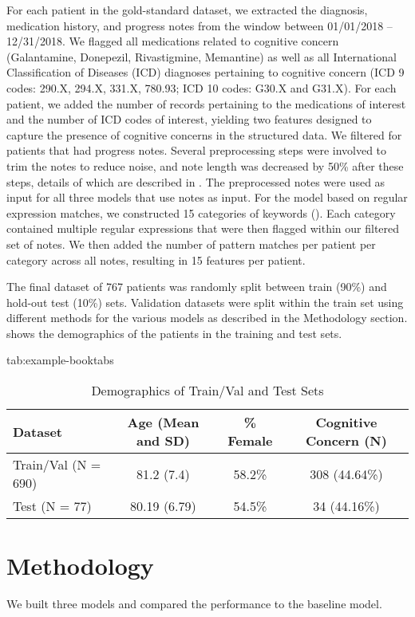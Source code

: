 \documentclass[pmlr,twocolumn]{jmlr} %
\begin{document}
For each patient in the gold-standard dataset, we extracted the diagnosis, medication history, and progress notes from the window between 01/01/2018 – 12/31/2018. We flagged all medications related to cognitive concern (Galantamine, Donepezil, Rivastigmine, Memantine) as well as all International Classification of Diseases (ICD) diagnoses pertaining to cognitive concern (ICD 9 codes: 290.X, 294.X, 331.X, 780.93; ICD 10 codes: G30.X and G31.X). For each patient, we added the number of records pertaining to the medications of interest and the number of ICD codes of interest, yielding two features designed to capture the presence of cognitive concerns in the structured data. We filtered for patients that had progress notes. Several preprocessing steps were involved to trim the notes to reduce noise, and note length was decreased by 50\% after these steps, details of which are described in . The preprocessed notes were used as input for all three models that use notes as input. For the model based on regular expression matches, we constructed 15 categories of keywords (). Each category contained multiple regular expressions that were then flagged within our filtered set of notes. We then added the number of pattern matches per patient per category across all notes, resulting in 15 features per patient.


The final dataset of 767 patients was randomly split between train (90\%) and hold-out test (10\%) sets. Validation datasets were split within the train set using different methods for the various models as described in the Methodology section.  shows the demographics of the patients in the training and test sets.

\begin{table*}[hbtp]
\floatconts
  {tab:example-booktabs}
  {\caption{Demographics of Train/Val and Test Sets}}
 {
  \begin{tabular}{lccc}
  \toprule
  \bfseries Dataset & \bfseries Age (Mean and SD) & \bfseries \% Female & \bfseries Cognitive Concern (N) \\
  \midrule
  Train/Val (N = 690) & 81.2 (7.4) & 58.2\% & 308 (44.64\%) \\
  Test (N = 77) & 80.19 (6.79) & 54.5\% & 34 (44.16\%) \\
  \bottomrule
  \end{tabular}}
\end{table*}

\section{Methodology}
\label{sec:methodology}
We built three models and compared the performance to the baseline  model.
\end{document}
